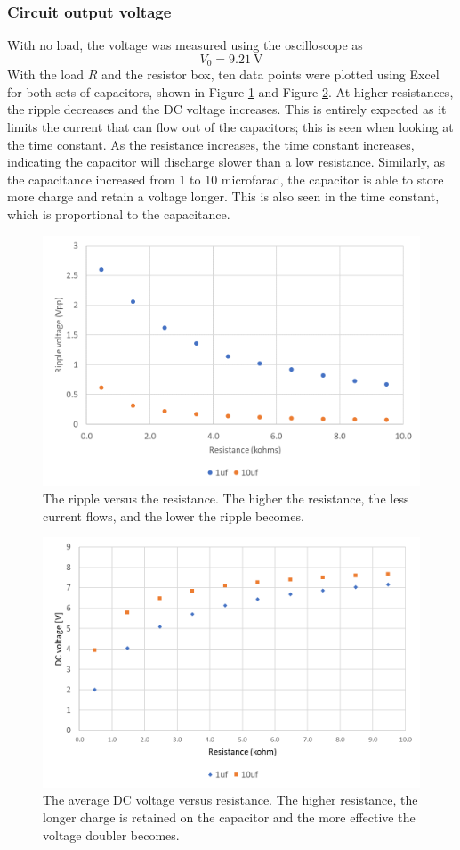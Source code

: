 \documentclass{report}
\begin{document}
\subsubsection{Circuit output voltage} 
With no load, the voltage was measured using the oscilloscope as
\[V_0 = \SI{9.21}{\V} \]
With the load $R$ and the resistor box, ten data points were plotted using Excel for both sets of capacitors, shown in Figure \ref{fig:exp5plotripple} and Figure \ref{fig:exp5plotdc}. At higher resistances, the ripple decreases and the DC voltage increases. This is entirely expected as it limits the current that can flow out of the capacitors; this is seen when looking at the time constant. As the resistance increases, the time constant increases, indicating the capacitor will discharge slower than a low resistance.
Similarly, as the capacitance increased from 1 to 10 microfarad, the capacitor is able to store more charge and retain a voltage longer. This is also seen in the time constant, which is proportional to the capacitance.

\begin{figure}[h]
	\centering
	\includegraphics[width=0.7\linewidth]{exp5plotripple}
	\caption{The ripple versus the resistance. The higher the resistance, the less current flows, and the lower the ripple becomes.}
	\label{fig:exp5plotripple}
\end{figure}
\begin{figure}[h]
	\centering
	\includegraphics[width=0.7\linewidth]{exp5plotdc}
	\caption{The average DC voltage versus resistance. The higher resistance, the longer charge is retained on the capacitor and the more effective the voltage doubler becomes.}
	\label{fig:exp5plotdc}
\end{figure}
\end{document}
